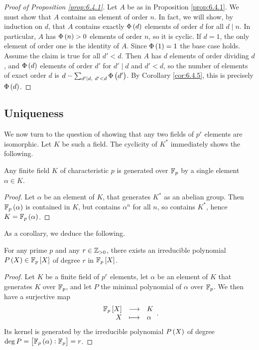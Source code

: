 \begin{proof}[Proof of Proposition \ref{prop:6.4.1}]
Let $ A $ be as in Proposition \ref{prop:6.4.1}. We must show that $ A $ contains an element of order $ n $. In fact, we will show, by induction on $ d $, that $ A $ contains exactly $ \Phi\br{d} $ elements of order $ d $ for all $ d \mid n $. In particular, $ A $ has $ \Phi\br{n} > 0 $ elements of order $ n $, so it is cyclic. If $ d = 1 $, the only element of order one is the identity of $ A $. Since $ \Phi\br{1} = 1 $ the base case holds. Assume the claim is true for all $ d' < d $. Then $ A $ has $ d $ elements of order dividing $ d $, and $ \Phi\br{d} $ elements of order $ d' $ for $ d' \mid d $ and $ d' < d $, so the number of elements of exact order $ d $ is $ d - \sum_{d' \mid d, \ d' < d} \Phi\br{d'} $. By Corollary \ref{cor:6.4.5}, this is precisely $ \Phi\br{d} $.
\end{proof}

\subsection{Uniqueness}

We now turn to the question of showing that any two fields of $ p^r $ elements are isomorphic. Let $ K $ be such a field. The cyclicity of $ K^* $ immediately shows the following.

\begin{proposition}
Any finite field $ K $ of characteristic $ p $ is generated over $ \mathbb{F}_p $ by a single element $ \alpha \in K $.
\end{proposition}

\begin{proof}
Let $ \alpha $ be an element of $ K $, that generates $ K^* $ as an abelian group. Then $ \FF_p\br{\alpha} $ is contained in $ K $, but contains $ \alpha^n $ for all $ n $, so contains $ K^* $, hence $ K = \FF_p\br{\alpha} $.
\end{proof}

As a corollary, we deduce the following.

\begin{proposition}
For any prime $ p $ and any $ r \in \mathbb{Z}_{> 0} $, there exists an irreducible polynomial $ P\br{X} \in \FF_p\sbr{X} $ of degree $ r $ in $ \FF_p\sbr{X} $.
\end{proposition}

\begin{proof}
Let $ K $ be a finite field of $ p^r $ elements, let $ \alpha $ be an element of $ K $ that generates $ K $ over $ \mathbb{F}_p $, and let $ P $ the minimal polynomial of $ \alpha $ over $ \mathbb{F}_p $. We then have a surjective map
$$ \function{\FF_p\sbr{X}}{K}{X}{\alpha}. $$
Its kernel is generated by the irreducible polynomial $ P\br{X} $ of degree $ \deg P = \sbr{\FF_p\br{\alpha} : \FF_p} = r $.
\end{proof}

